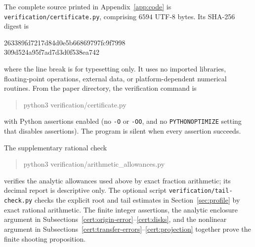 The complete source printed in Appendix~\ref{app:code} is
\texttt{verification/certificate.py}, comprising \(6594\) UTF-8 bytes.
Its SHA-256 digest is
\begin{center}\small\ttfamily
263389fd7217d84d0e5b66869797fc9f7998\\
309d524a95f7ad7d3d0f538ea742
\end{center}
where the line break is for typesetting only.
It uses no imported libraries, floating-point operations, external data,
or platform-dependent numerical routines.  From the paper directory,
the verification command is
\begin{quote}\ttfamily
python3 verification/certificate.py
\end{quote}
with Python assertions enabled (no \texttt{-O} or \texttt{-OO}, and no
\texttt{PYTHONOPTIMIZE} setting that disables assertions).
The program is silent when every assertion succeeds.

The supplementary rational check
\begin{quote}\ttfamily
python3 verification/arithmetic\_allowances.py
\end{quote}
verifies the analytic allowances used above by exact fraction arithmetic;
its decimal report is descriptive only.
The optional script \texttt{verification/tail-check.py} checks the explicit
root and tail estimates in Section~\ref{sec:profile} by exact rational
arithmetic.
The finite integer assertions, the analytic enclosure argument in
Subsections~\ref{cert:origin-error}--\ref{cert:disks}, and the nonlinear
argument in Subsections~\ref{cert:transfer-errors}--\ref{cert:projection}
together prove the finite shooting proposition.

